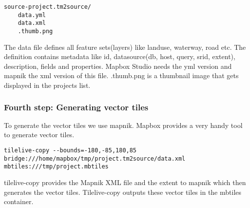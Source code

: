 \begin{verbatim}
source-project.tm2source/
    data.yml
    data.xml
    .thumb.png
\end{verbatim}

The data file defines all feature sets(layers) like landuse, waterway,
road etc. The definition contains metadata like id, datasource(db, host,
query, srid, extent), description, fields and properties. Mapbox Studio
needs the yml version and mapnik the xml version of this file.
.thumb.png is a thumbnail image that gets displayed in the projects
list.

\subsubsection{Fourth step: Generating vector
tiles}\label{fourth-step-generating-vector-tiles}

To generate the vector tiles we use mapnik. Mapbox provides a very handy
tool to generate vector tiles.

\begin{verbatim}
tilelive-copy --bounds=-180,-85,180,85 bridge:///home/mapbox/tmp/project.tm2source/data.xml mbtiles:///tmp/project.mbtiles
\end{verbatim}

tilelive-copy provides the Mapnik XML file and the extent to mapnik
which then generates the vector tiles. Tilelive-copy outputs these
vector tiles in the mbtiles container.

